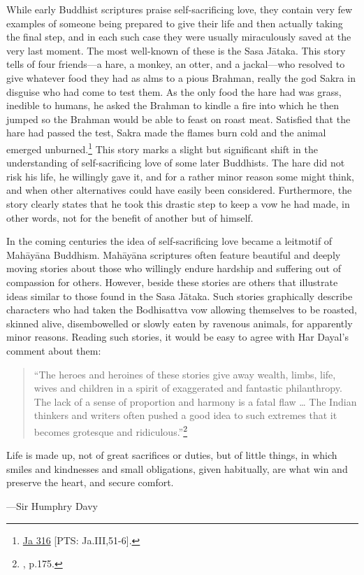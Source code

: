 \documentclass[10pt, openright]{book}
\newenvironment{epigram-2}%
{%
\setstretch{1.4}
\vspace{1em}
\noindent
\quoting[leftmargin=2cm,rightmargin=2cm]%
\begin{itshape}
\large
}%
{\end{itshape}\endquoting
}%
\newenvironment{epigram-2-cite}%
{%
\quoting[leftmargin=2cm,rightmargin=2cm]%
\noindent\normal\hspace*{\fill} 
}%
{\endquoting
}%
\begin{document}
While early Buddhist scriptures praise self-sacrificing love, they contain very few examples of someone being prepared to give their life and then actually taking the final step, and in each such case they were usually miraculously saved at the very last moment. The most well-known of these is the Sasa Jātaka. This story tells of four friends—a hare, a monkey, an otter, and a jackal—who resolved to give whatever food they had as alms to a pious Brahman, really the god Sakra in disguise who had come to test them. As the only food the hare had was grass, inedible to humans, he asked the Brahman to kindle a fire into which he then jumped so the Brahman would be able to feast on roast meat. Satisfied that the hare had passed the test, Sakra made the flames burn cold and the animal emerged unburned.\footnote {\href{https://suttacentral.net/ja316/en/francis-neil}{Ja 316} [PTS: Ja.III,51-6].} This story marks a slight but significant shift in the understanding of self-sacrificing love of some later Buddhists. The hare did not risk his life, he willingly gave it, and for a rather minor reason some might think, and when other alternatives could have easily been considered. Furthermore, the story clearly states that he took this drastic step to keep a vow he had made, in other words, not for the benefit of another but of himself.


In the coming centuries the idea of self-sacrificing love became a leitmotif of Mahāyāna Buddhism. Mahāyāna scriptures often feature beautiful and deeply moving stories about those who willingly endure hardship and suffering out of compassion for others. However, beside these stories are others that illustrate ideas similar to those found in the Sasa Jātaka. Such stories graphically describe characters who had taken the Bodhisattva vow allowing themselves to be roasted, skinned alive, disembowelled or slowly eaten by ravenous animals, for apparently minor reasons. Reading such stories, it would be easy to agree with Har Dayal’s comment about them:


\begin{quote}


“The heroes and heroines of these stories give away wealth, limbs, life, wives and children in a spirit of exaggerated and fantastic philanthropy. The lack of a sense of proportion and harmony is a fatal flaw … The Indian thinkers and writers often pushed a good idea to such extremes that it becomes grotesque and ridiculous.”\footnote {\cite{Dayal 1970}, p.175.}




\end{quote}
\begin{epigram-2}
Life is made up, not of great sacrifices or duties, but of little things, in which smiles and kindnesses and small obligations, given habitually, are what win and preserve the heart, and secure comfort.
\end{epigram-2}
\begin{epigram-2-cite}
—Sir Humphry Davy
\end{epigram-2-cite}
\end{document}
